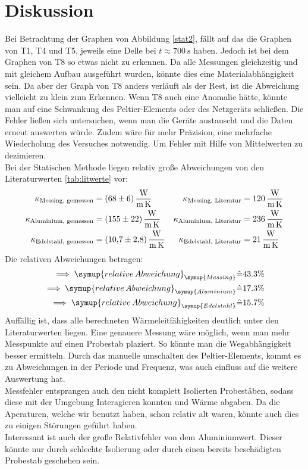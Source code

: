 \section{Diskussion}
\label{sec:Diskussion}
Bei Betrachtung der Graphen von Abbildung \ref{stat2}, fällt auf das die Graphen von T1, T4 und T5, jeweils eine Delle bei $t \approx \SI{700}{\second}$ haben.
Jedoch ist bei dem Graphen von T8 so etwas nicht zu erkennen. Da alle Messungen gleichzeitig und mit gleichem Aufbau ausgeführt wurden, 
könnte dies eine Materialabhängigkeit sein. Da aber der Graph von T8 anders verläuft als der Rest, ist die Abweichung vielleicht zu klein zum Erkennen.
Wenn T8 auch eine Anomalie hätte, könnte man auf eine Schwankung des Peltier-Elements oder des Netzgeräts schließen.
Die Fehler ließen sich untersuchen, wenn man die Geräte austauscht und die Daten erneut auswerten würde. 
Zudem wäre für mehr Präzision, eine mehrfache Wiederholung des Versuches notwendig. Um Fehler mit Hilfe von Mittelwerten zu dezimieren.
\\
Bei der Statischen Methode liegen relativ große Abweichungen von den Literaturwerten \ref{tab:litwerte} vor:
\begin{align*}
    \kappa_\text{Messing, gemessen} &= \SI{68 \pm 6}{\watt\per\metre\per\kelvin} & \kappa_\text{Messing, Literatur} &= \SI{120}{\watt\per\metre\per\kelvin}\\
    \kappa_\text{Aluminium, gemessen} &= \SI{155 \pm 22}{\watt\per\metre\per\kelvin} & \kappa_\text{Aluminium, Literatur} &= \SI{236}{\watt\per\metre\per\kelvin}\\
    \kappa_\text{Edelstahl, gemessen} &= \SI{10.7 \pm 2.8}{\watt\per\metre\per\kelvin} & \kappa_\text{Edelstahl, Literatur} &= \SI{21}{\watt\per\metre\per\kelvin}
\end{align*}
Die relativen Abweichungen betragen:
\begin{align*}
    \implies \symup{relative\,Abweichung}_{\symup{Messing}} &\hat{=} 43.3 \%\\
    \implies \symup{relative\,Abweichung}_{\symup{Aluminium}} &\hat{=} 17.3\%\\
    \implies \symup{relative\,Abweichung}_{\symup{Edelstahl}} &\hat{=} 15.7 \%
\end{align*}
Auffällig ist, dass alle berechneten Wärmeleitfähigkeiten deutlich unter den Literaturwerten liegen.
Eine genauere Messung wäre möglich, wenn man mehr Messpunkte auf einen Probestab plaziert. So könnte man die Wegabhängigkeit besser ermitteln.
Durch das manuelle umschalten des Peltier-Elements, kommt es zu Abweichungen in der Periode und Frequenz, was auch einfluss auf die weitere Auswertung hat.
\\
Messfehler entsprangen auch den nicht komplett Isolierten Probestäben, sodass diese mit der Umgebung Interagieren konnten und Wärme abgaben.
Da die Aperaturen, welche wir benutzt haben, schon relativ alt waren, könnte auch dies zu einigen Störungen geführt haben.
\\
Interessant ist auch der große Relativfehler von dem Aluminiumwert. Dieser könnte nur durch schlechte Isolierung oder durch einen bereits beschädigten Probestab geschehen sein.


